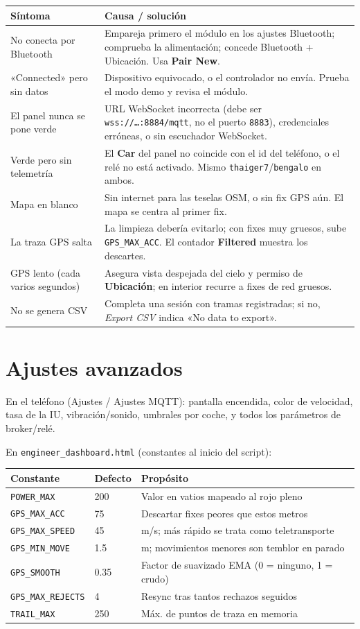\documentclass[11pt,a4paper,oneside]{report}
\newcommand{\code}[1]{\texttt{#1}}
\begin{document}
\begin{tabularx}{\linewidth}{@{}LL@{}}
\toprule
\textbf{Síntoma} & \textbf{Causa / solución}\\
\midrule
No conecta por Bluetooth & Empareja primero el módulo en los ajustes Bluetooth; comprueba la alimentación; concede Bluetooth + Ubicación. Usa \textbf{Pair New}.\\
«Connected» pero sin datos & Dispositivo equivocado, o el controlador no envía. Prueba el modo demo y revisa el módulo.\\
El panel nunca se pone verde & URL WebSocket incorrecta (debe ser \code{wss://\ldots:8884/mqtt}, no el puerto \code{8883}), credenciales erróneas, o sin escuchador WebSocket.\\
Verde pero sin telemetría & El \textbf{Car} del panel no coincide con el id del teléfono, o el relé no está activado. Mismo \code{thaiger7}/\code{bengalo} en ambos.\\
Mapa en blanco & Sin internet para las teselas OSM, o sin fix GPS aún. El mapa se centra al primer fix.\\
La traza GPS salta & La limpieza debería evitarlo; con fixes muy gruesos, sube \code{GPS\_MAX\_ACC}. El contador \textbf{Filtered} muestra los descartes.\\
GPS lento (cada varios segundos) & Asegura vista despejada del cielo y permiso de \textbf{Ubicación}; en interior recurre a fixes de red gruesos.\\
No se genera CSV & Completa una sesión con tramas registradas; si no, \emph{Export CSV} indica «No data to export».\\
\bottomrule
\end{tabularx}

\section{Ajustes avanzados}
En el teléfono (Ajustes / Ajustes MQTT): pantalla encendida, color de velocidad,
tasa de la IU, vibración/sonido, umbrales por coche, y todos los parámetros de
broker/relé.

\medskip
\noindent En \code{engineer\_dashboard.html} (constantes al inicio del script):

\begin{tabularx}{\linewidth}{@{}llL@{}}
\toprule
\textbf{Constante} & \textbf{Defecto} & \textbf{Propósito}\\
\midrule
\code{POWER\_MAX} & 200 & Valor en vatios mapeado al rojo pleno\\
\code{GPS\_MAX\_ACC} & 75 & Descartar fixes peores que estos metros\\
\code{GPS\_MAX\_SPEED} & 45 & m/s; más rápido se trata como teletransporte\\
\code{GPS\_MIN\_MOVE} & 1.5 & m; movimientos menores son temblor en parado\\
\code{GPS\_SMOOTH} & 0.35 & Factor de suavizado EMA (0 = ninguno, 1 = crudo)\\
\code{GPS\_MAX\_REJECTS} & 4 & Resync tras tantos rechazos seguidos\\
\code{TRAIL\_MAX} & 250 & Máx. de puntos de traza en memoria\\
\bottomrule
\end{tabularx}
\end{document}
